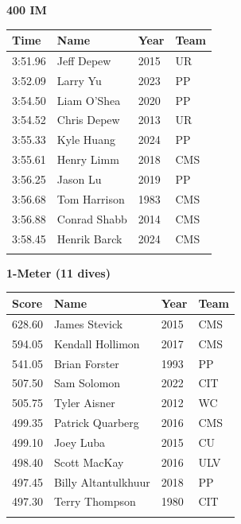 \vspace{1.2em}
\noindent\begin{minipage}[t]{0.98\textwidth}
\centering
\textbf{\textcolor{teamprimary}{400 IM}}\par
\vspace{0.5em}
\centering
\small
\renewcommand{\arraystretch}{1.0}
\setlength{\tabcolsep}{4pt}
\begin{tabular}{@{}p{2.5cm}p{4.5cm}p{1.5cm}p{2.5cm}@{}}
\toprule
\textbf{Time} & \textbf{Name} & \textbf{Year} & \textbf{Team} \\
\midrule
3:51.96 & Jeff Depew & 2015 & UR \\
3:52.09 & Larry Yu & 2023 & PP \\
3:54.50 & Liam O'Shea & 2020 & PP \\
3:54.52 & Chris Depew & 2013 & UR \\
3:55.33 & Kyle Huang & 2024 & PP \\
3:55.61 & Henry Limm & 2018 & CMS \\
3:56.25 & Jason Lu & 2019 & PP \\
3:56.68 & Tom Harrison & 1983 & CMS \\
3:56.88 & Conrad Shabb & 2014 & CMS \\
3:58.45 & Henrik Barck & 2024 & CMS \\
\bottomrule
\vspace{0.5em}
\end{tabular}
\end{minipage}
\vspace{1.2em}
\noindent\begin{minipage}[t]{0.98\textwidth}
\centering
\textbf{\textcolor{teamprimary}{1-Meter (11 dives)}}\par
\vspace{0.5em}
\centering
\small
\renewcommand{\arraystretch}{1.0}
\setlength{\tabcolsep}{4pt}
\begin{tabular}{@{}p{2.5cm}p{4.5cm}p{1.5cm}p{2.5cm}@{}}
\toprule
\textbf{Score} & \textbf{Name} & \textbf{Year} & \textbf{Team} \\
\midrule
628.60 & James Stevick & 2015 & CMS \\
594.05 & Kendall Hollimon & 2017 & CMS \\
541.05 & Brian Forster & 1993 & PP \\
507.50 & Sam Solomon & 2022 & CIT \\
505.75 & Tyler Aisner & 2012 & WC \\
499.35 & Patrick Quarberg & 2016 & CMS \\
499.10 & Joey Luba & 2015 & CU \\
498.40 & Scott MacKay & 2016 & ULV \\
497.45 & Billy Altantulkhuur & 2018 & PP \\
497.30 & Terry Thompson & 1980 & CIT \\
\bottomrule
\vspace{0.5em}
\end{tabular}
\end{minipage}
